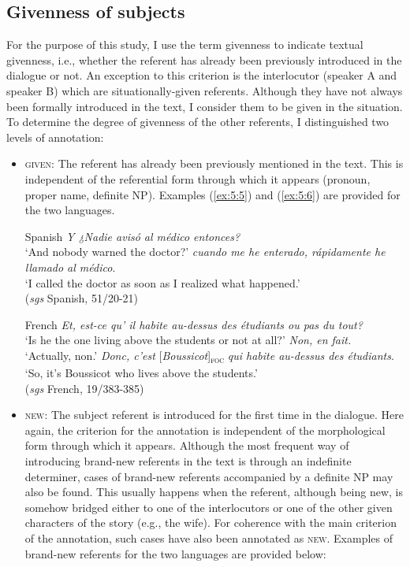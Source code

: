 \subsection{Givenness of subjects} \label{sub:6.4.2}
For the purpose of this study, I use the term givenness to indicate textual givenness, i.e., whether the referent has already been previously introduced in the dialogue or not. An exception to this criterion is the interlocutor (speaker A and speaker B) which are situationally-given referents. Although they have not always been formally introduced in the text, I consider them to be given in the situation. To determine the degree of givenness of the other referents, I distinguished two levels of annotation: 
\begin{itemize}
    \item \textsc{given}: The referent has already been previously mentioned in the text. This is independent of the referential form through which it appears (pronoun, proper name, definite NP). Examples (\ref{ex:5:5}) and (\ref{ex:5:6}) are provided for the two languages.

\ea \label{ex:5:5} Spanish
\ea 	\textit{Y ¿Nadie avisó al médico entonces?}\\
 `And nobody warned the doctor?'
\normalsize\textit{cuando me he enterado, rápidamente he llamado al médico}.\\
`I called the doctor as soon as I realized what happened.'\\ \hfill (\textit{sgs} Spanish, 51/20-21)     
\z \z

\ea \label{ex:5:6} French
\ea \textit{Et, est-ce qu' il habite au-dessus des étudiants ou pas du tout?}\\
 `Is he the one living above the students or not at all?'
\ex \textit{Non, en fait.}\\    
`Actually, non.'
 \textit{Donc, c'est} {[\textit{Boussicot}]\textsubscript{\textsc{foc}}} \normalsize \textit{qui habite au-dessus des étudiants}.\\
`So, it's Boussicot who lives above the students.' \\
\hfill (\textit{sgs} French, 19/383-385)     
\z \z 

\item \textsc{new}: The subject referent is introduced for the first time in the dialogue. Here again, the criterion for the annotation is independent of the morphological form through which it appears. Although the most frequent way of introducing brand-new referents in the text is through an indefinite determiner, cases of brand-new referents accompanied by a definite NP may also be found. This usually happens when the referent, although being new, is somehow bridged either to one of the interlocutors or one of the other given characters of the story (e.g., the wife). For coherence with the main criterion of the annotation, such cases have also been annotated as \textsc{new}. Examples of brand-new referents for the two languages are provided below:


\end{itemize}
